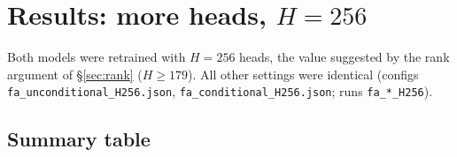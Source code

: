 
\section{Results: more heads, $H=256$}\label{sec:res_H256}
Both models were retrained with $H=256$ heads, the value suggested by the rank argument of \S\ref{sec:rank}
($H\ge179$). All other settings were identical (configs \texttt{fa\_unconditional\_H256.json},
\texttt{fa\_conditional\_H256.json}; runs \texttt{fa\_*\_H256}).

\subsection{Summary table}
